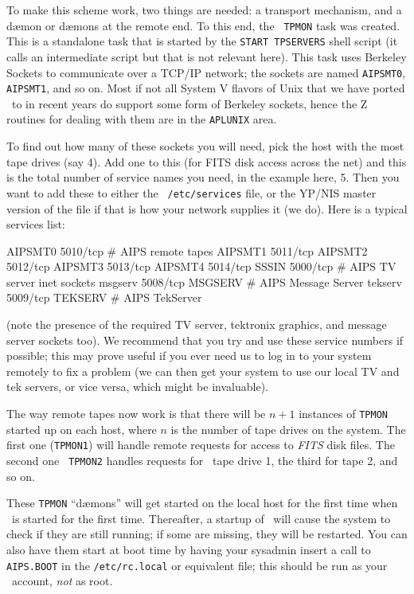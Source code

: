 To make this scheme work, two things are needed: a transport mechanism,
and a d\ae mon or d\ae mons at the remote end.  To this end, the {\tt
TPMON} task was created.  This is a standalone task that is started by
the {\tt START TPSERVERS} shell script (it calls an intermediate script
but that is not relevant here).  This task uses Berkeley Sockets to
communicate over a TCP/IP network; the sockets are named {\tt AIPSMT0},
{\tt AIPSMT1}, and so on.  Most if not all System V flavors of Unix that
we have ported \AIPS\ to in recent years do support some form of
Berkeley sockets, hence the Z routines for dealing with them are in the
{\tt\dol APLUNIX} area.

To find out how many of these sockets you will need, pick the host with
the most tape drives (say 4).  Add one to this (for FITS disk access
across the net) and this is the total number of service names you need,
in the example here, 5.  Then you want to add these to either the {\tt
/etc/services} file, or the YP/NIS master version of the file if that is
how your network supplies it (we do).  Here is a typical services list:
\medskip

\fortran
AIPSMT0         5010/tcp              # AIPS remote tapes
AIPSMT1         5011/tcp
AIPSMT2         5012/tcp
AIPSMT3         5013/tcp
AIPSMT4         5014/tcp
SSSIN           5000/tcp              # AIPS TV server inet sockets
msgserv         5008/tcp    MSGSERV   # AIPS Message Server
tekserv         5009/tcp    TEKSERV   # AIPS TekServer
\endfortran
\medskip

\noindent (note the presence of the required TV server, tektronix
graphics, and message server sockets too).  We recommend that you try
and use these service numbers if possible; this may prove useful if you
ever need us to log in to your system remotely to fix a problem (we can
then get your system to use our local TV and tek servers, or vice versa,
which might be invaluable).

The way remote tapes now work is that there will be $n+1$ instances of
{\tt TPMON} started up on each host, where $n$ is the number of tape
drives on the system.  The first one ({\tt TPMON1}) will handle remote
requests for access to {\it FITS\/} disk files.  The second one {\tt
TPMON2} handles requests for \AIPS\ tape drive 1, the third for tape 2,
and so on.

These {\tt TPMON} ``d\ae mons'' will get started on the local host for
the first time when \AIPS\ is started for the first time.  Thereafter, a
startup of \AIPS\ will cause the system to check if they are still
running; if some are missing, they will be restarted.  You can also have
them start at boot time by having your sysadmin insert a call to {\tt
AIPS.BOOT} in the {\tt /etc/rc.local} or equivalent file; this should be
run as your \AIPS\ account, {\it not\/} as root.

